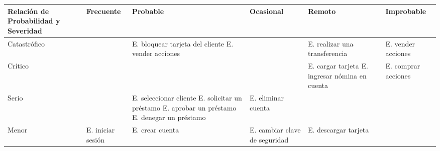 \begin{adjustwidth}{0cm}{-8cm}
	\begin{multicols}{2}
		\begin{table}[H]
			\fontsize{8}{9}\selectfont
			\centering
			\begin{tabularx}{0.7\textwidth}{|>{\centering}X|>{\centering}X|>{\centering}X|>{\centering}X|>{\centering}X|X|}
				\hline
				\textbf{Relación de \textbf{Probabilidad} y Severidad} & Frecuente                                         & Probable                                                                          & Ocasional                                             & Remoto                                                                       & Improbable                                \\
				\hline
				Catastrófico                                           & \cellcolor{riskred}                               & \cellcolor{riskred}   E. bloquear tarjeta del cliente \newline E. vender acciones & \cellcolor{riskred}                                   & \cellcolor{riskyellow} E. realizar una transferencia                         & \cellcolor{riskgreen} E. vender acciones  \\
				\hline
				Crítico                                                & \cellcolor{riskred}                               & \cellcolor{riskred}                                                               & \cellcolor{riskyellow}                                & \cellcolor{riskgreen} E. cargar tarjeta \newline	E. ingresar nómina en cuenta & \cellcolor{riskpurple}E. comprar acciones \\
				\hline
				Serio                                                  & \cellcolor{riskyellow}                            & \cellcolor{riskyellow} E. seleccionar cliente\newline
				E. solicitar un préstamo\newline
				E. aprobar un préstamo\newline
				E. denegar un préstamo\newline                         & \cellcolor{riskgreen} E. eliminar cuenta          & \cellcolor{riskpurple}                                                            & \cellcolor{riskblue}                                                                                                                                                             \\
				\hline
				Menor                                                  & \cellcolor{riskgreen} E. iniciar sesión           & \cellcolor{riskgreen}E. crear cuenta                                              & \cellcolor{riskpurple}E. cambiar clave de seguridad   & \cellcolor{riskblue} E. descargar tarjeta\newline

\end{tabularx}
\end{table}
\end{multicols}
\end{adjustwidth}
